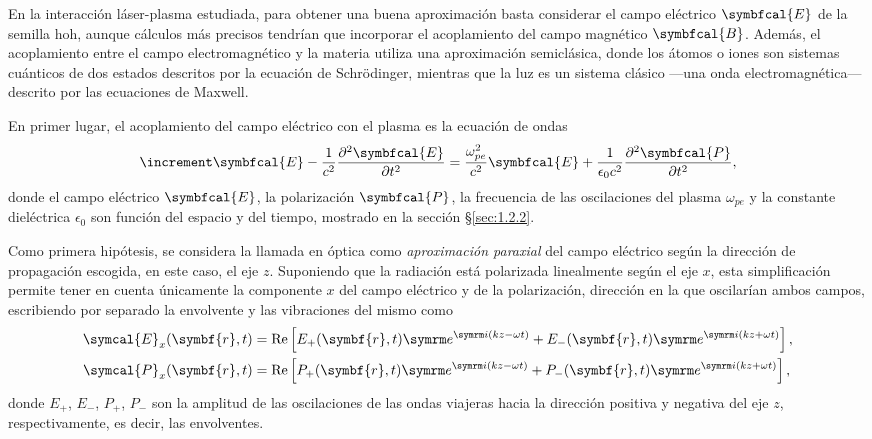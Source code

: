 En la interacción láser-plasma estudiada, para obtener una buena aproximación basta considerar el campo eléctrico $\symbfcal{E}$ de la semilla \acrshort{hoh}, aunque cálculos más precisos tendrían que incorporar el acoplamiento del campo magnético $\symbfcal{B}$. Además, el acoplamiento entre el campo electromagnético y la materia utiliza una aproximación semiclásica, donde los átomos o iones son sistemas cuánticos de dos estados descritos por la ecuación de Schrödinger, mientras que la luz es un sistema clásico ---una onda electromagnética--- descrito por las ecuaciones de Maxwell.

En primer lugar, el acoplamiento del campo eléctrico con el plasma es la ecuación de ondas 
\begin{equation}\label{eq:3.1}
  \laplacian \symbfcal{E} - \frac{1}{c^{2}}\pdvN{\symbfcal{E}}{t}{2} = \frac{\omega^{2}_{pe}}{c^{2}}\symbfcal{E} + \frac{1}{\epsilon_{0}c^{2}}\pdvN{\symbfcal{P}}{t}{2},
\end{equation}
donde el campo eléctrico $\symbfcal{E}$, la polarización $\symbfcal{P}$, la frecuencia de las oscilaciones del plasma $\omega_{pe}$ y la constante dieléctrica $\epsilon_{0}$ son función del espacio y del tiempo, mostrado en la sección \S\ref{sec:1.2.2}. 

Como primera hipótesis, se considera la llamada en óptica\autocite{Born2019} como \emph{aproximación paraxial} del campo eléctrico según la dirección de propagación escogida, en este caso, el eje $z$. Suponiendo que la radiación está polarizada linealmente según el eje $x$, esta simplificación permite tener en cuenta únicamente la componente $x$ del campo eléctrico y de la polarización, dirección en la que oscilarían ambos campos, escribiendo por separado la envolvente y las vibraciones del mismo como
\begin{align}
  \label{eq:3.2a}
  \symcal{E}_{x}(\symbf{r},t) &= \RE \left[E_{+}(\symbf{r},t)\eu^{\iu (kz - \omega t)} + E_{-}(\symbf{r},t)\eu^{\iu (kz + \omega t)}\right], \\
  \label{eq:3.2b}
  \symcal{P}_{x}(\symbf{r},t) &= \RE \left[P_{+}(\symbf{r},t)\eu^{\iu (kz - \omega t)} + P_{-}(\symbf{r},t)\eu^{\iu (kz + \omega t)}\right], 
\end{align}
donde $E_{+}$, $E_{-}$, $P_{+}$, $P_{-}$ son la amplitud de las oscilaciones de las ondas viajeras hacia la dirección positiva y negativa del eje $z$, respectivamente, es decir, las envolventes. 

